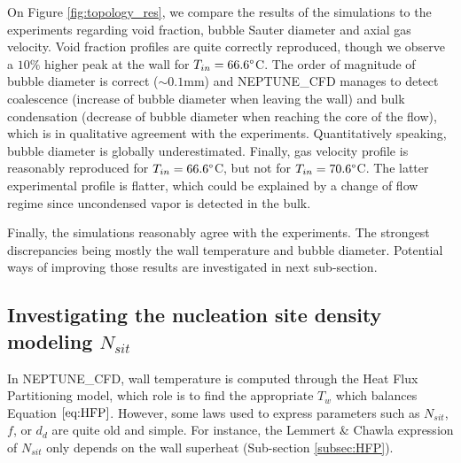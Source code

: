 On Figure \ref{fig:topology_res}, we compare the results of the simulations to the experiments regarding void fraction, bubble Sauter diameter and axial gas velocity. Void fraction profiles are quite correctly reproduced, though we observe a $10\%$ higher peak at the wall for $T_{in}=66.6\degree$C. The order of magnitude of bubble diameter is correct ($\sim 0.1\text{mm}$) and NEPTUNE\_CFD manages to detect coalescence (increase of bubble diameter when leaving the wall) and bulk condensation (decrease of bubble diameter when reaching the core of the flow), which is in qualitative agreement with the experiments. Quantitatively speaking, bubble diameter is globally underestimated. Finally, gas velocity profile is reasonably reproduced for $T_{in}=66.6\degree$C, but not for $T_{in}=70.6\degree$C. The latter experimental profile is flatter, which could be explained by a change of flow regime since uncondensed vapor is detected in the bulk.  

Finally, the simulations reasonably agree with the experiments. The strongest discrepancies being mostly the wall temperature and bubble diameter. Potential ways of improving those results are investigated in next sub-section.

\subsection{Investigating the nucleation site density modeling $N_{sit}$}

In NEPTUNE\_CFD, wall temperature is computed through the Heat Flux Partitioning model, which role is to find the appropriate $T_{w}$ which balances Equation $\ref{eq:HFP}$. However, some laws used to express parameters such as $N_{sit}$, $f$, or $d_{d}$ are quite old and simple. For instance, the {Lemmert} \& {Chawla}\cite{Lemmert1977} expression of $N_{sit}$ only depends on the wall superheat (Sub-section \ref{subsec:HFP}).%

